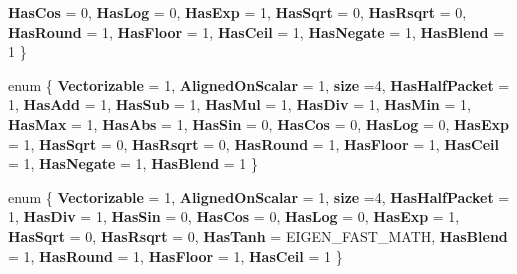 \begin{DoxyCompactItemize}
\newline
{\bfseries Has\+Cos} = 0, 
{\bfseries Has\+Log} = 0, 
{\bfseries Has\+Exp} = 1, 
{\bfseries Has\+Sqrt} = 0, 
\newline
{\bfseries Has\+Rsqrt} = 0, 
{\bfseries Has\+Round} = 1, 
{\bfseries Has\+Floor} = 1, 
{\bfseries Has\+Ceil} = 1, 
\newline
{\bfseries Has\+Negate} = 1, 
{\bfseries Has\+Blend} = 1
 \}
\item 
\mbox{\label{struct_eigen_1_1internal_1_1packet__traits_3_01float_01_4_a771c0c34c578d0eb656434e66c9ca9a1}} 
enum \{ \newline
{\bfseries Vectorizable} = 1, 
{\bfseries Aligned\+On\+Scalar} = 1, 
{\bfseries size} =4, 
{\bfseries Has\+Half\+Packet} = 1, 
\newline
{\bfseries Has\+Add} = 1, 
{\bfseries Has\+Sub} = 1, 
{\bfseries Has\+Mul} = 1, 
{\bfseries Has\+Div} = 1, 
\newline
{\bfseries Has\+Min} = 1, 
{\bfseries Has\+Max} = 1, 
{\bfseries Has\+Abs} = 1, 
{\bfseries Has\+Sin} = 0, 
\newline
{\bfseries Has\+Cos} = 0, 
{\bfseries Has\+Log} = 0, 
{\bfseries Has\+Exp} = 1, 
{\bfseries Has\+Sqrt} = 0, 
\newline
{\bfseries Has\+Rsqrt} = 0, 
{\bfseries Has\+Round} = 1, 
{\bfseries Has\+Floor} = 1, 
{\bfseries Has\+Ceil} = 1, 
\newline
{\bfseries Has\+Negate} = 1, 
{\bfseries Has\+Blend} = 1
 \}
\item 
\mbox{\label{struct_eigen_1_1internal_1_1packet__traits_3_01float_01_4_ab4d57d3c918fd619701d817d5f8bb286}} 
enum \{ \newline
{\bfseries Vectorizable} = 1, 
{\bfseries Aligned\+On\+Scalar} = 1, 
{\bfseries size} =4, 
{\bfseries Has\+Half\+Packet} = 1, 
\newline
{\bfseries Has\+Div} = 1, 
{\bfseries Has\+Sin} = 0, 
{\bfseries Has\+Cos} = 0, 
{\bfseries Has\+Log} = 0, 
\newline
{\bfseries Has\+Exp} = 1, 
{\bfseries Has\+Sqrt} = 0, 
{\bfseries Has\+Rsqrt} = 0, 
{\bfseries Has\+Tanh} = E\+I\+G\+E\+N\+\_\+\+F\+A\+S\+T\+\_\+\+M\+A\+TH, 
\newline
{\bfseries Has\+Blend} = 1, 
{\bfseries Has\+Round} = 1, 
{\bfseries Has\+Floor} = 1, 
{\bfseries Has\+Ceil} = 1
 \}
\item 

\end{DoxyCompactItemize}
